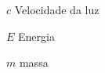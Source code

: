 
\begin{simbolos} \itemsep -1pt
	\item[$ c $] Velocidade da luz
	\item[$ E $] Energia
	\item[$ m $] massa
\end{simbolos}
